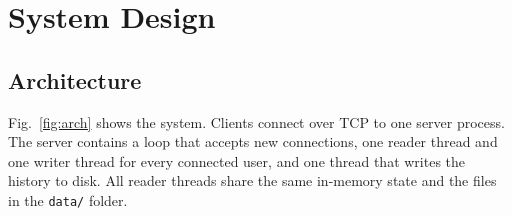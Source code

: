 \documentclass[conference]{IEEEtran}
\newcommand{\code}[1]{\texttt{#1}}
\begin{document}
\section{System Design}

\subsection{Architecture}
Fig.~\ref{fig:arch} shows the system. Clients connect over TCP to one server process. The server contains
a loop that accepts new connections, one reader thread and one writer thread for every connected user, and one thread that writes the history to disk.
All reader threads share the same in-memory state and the files in the \code{data/} folder.
\end{document}
